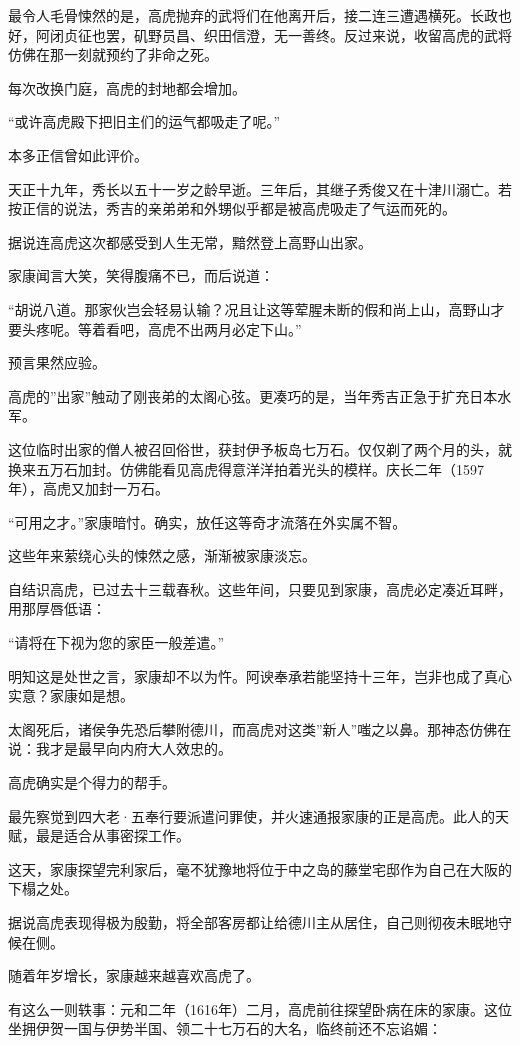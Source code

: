 \documentclass[
]{book}
\begin{document}
最令人毛骨悚然的是，高虎抛弃的武将们在他离开后，接二连三遭遇横死。长政也好，阿闭贞征也罢，矶野员昌、织田信澄，无一善终。反过来说，收留高虎的武将仿佛在那一刻就预约了非命之死。

每次改换门庭，高虎的封地都会增加。

``或许高虎殿下把旧主们的运气都吸走了呢。''

本多正信曾如此评价。

天正十九年，秀长以五十一岁之龄早逝。三年后，其继子秀俊又在十津川溺亡。若按正信的说法，秀吉的亲弟弟和外甥似乎都是被高虎吸走了气运而死的。

据说连高虎这次都感受到人生无常，黯然登上高野山出家。

家康闻言大笑，笑得腹痛不已，而后说道：

``胡说八道。那家伙岂会轻易认输？况且让这等荤腥未断的假和尚上山，高野山才要头疼呢。等着看吧，高虎不出两月必定下山。''

预言果然应验。

高虎的''出家''触动了刚丧弟的太阁心弦。更凑巧的是，当年秀吉正急于扩充日本水军。

这位临时出家的僧人被召回俗世，获封伊予板岛七万石。仅仅剃了两个月的头，就换来五万石加封。仿佛能看见高虎得意洋洋拍着光头的模样。庆长二年（1597年），高虎又加封一万石。

``可用之才。''家康暗忖。确实，放任这等奇才流落在外实属不智。

这些年来萦绕心头的悚然之感，渐渐被家康淡忘。

自结识高虎，已过去十三载春秋。这些年间，只要见到家康，高虎必定凑近耳畔，用那厚唇低语：

``请将在下视为您的家臣一般差遣。''

明知这是处世之言，家康却不以为忤。阿谀奉承若能坚持十三年，岂非也成了真心实意？家康如是想。

太阁死后，诸侯争先恐后攀附德川，而高虎对这类''新人''嗤之以鼻。那神态仿佛在说：我才是最早向内府大人效忠的。

高虎确实是个得力的帮手。

最先察觉到四大老·五奉行要派遣问罪使，并火速通报家康的正是高虎。此人的天赋，最是适合从事密探工作。

这天，家康探望完利家后，毫不犹豫地将位于中之岛的藤堂宅邸作为自己在大阪的下榻之处。

据说高虎表现得极为殷勤，将全部客房都让给德川主从居住，自己则彻夜未眠地守候在侧。

随着年岁增长，家康越来越喜欢高虎了。

有这么一则轶事：元和二年（1616年）二月，高虎前往探望卧病在床的家康。这位坐拥伊贺一国与伊势半国、领二十七万石的大名，临终前还不忘谄媚：
\end{document}
